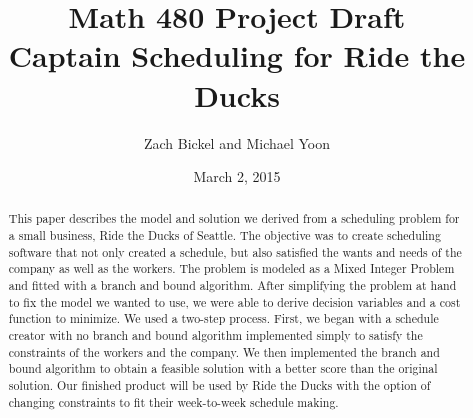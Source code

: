 \documentclass[12pt]{article}
\begin{document}
\title{Math 480 Project Draft \\ Captain Scheduling for Ride the Ducks} 

\author{Zach Bickel and Michael Yoon}
\date{March 2, 2015}
\maketitle

\begin{abstract}
This paper describes the model and solution we derived from a scheduling problem for a 
small business, Ride the Ducks of Seattle. The objective was to create scheduling 
software that not only created a schedule, but also satisfied the wants and needs of the 
company as well as the workers. The problem is modeled as a Mixed Integer Problem 
and fitted with a branch and bound algorithm. After simplifying the problem at hand to 
fix the model we wanted to use, we were able to derive decision variables and a cost 
function to minimize. We used a two-step process. First, we began with a schedule 
creator with no branch and bound algorithm implemented simply to satisfy the constraints of the 
workers and the company. We then implemented the 
branch and bound algorithm to obtain a feasible solution with a better score than the original solution. Our finished product will be used 
by Ride the Ducks with the option of changing constraints to fit their week-to-week 
schedule making.
\end{abstract}
\end{document}
